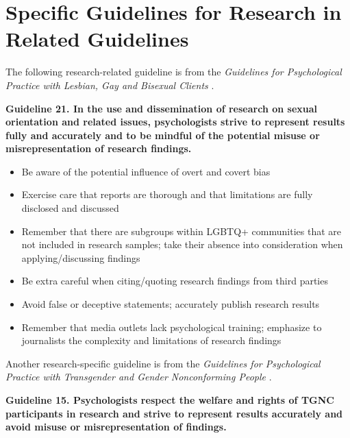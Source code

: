\documentclass[
  english,
]{book}
\providecommand{\tightlist}{%
  \setlength{\itemsep}{0pt}\setlength{\parskip}{0pt}}
\begin{document}
\hypertarget{specific-guidelines-for-research-in-related-guidelines}{%
\section{Specific Guidelines for Research in Related Guidelines}\label{specific-guidelines-for-research-in-related-guidelines}}

The following research-related guideline is from the \emph{Guidelines for Psychological Practice with Lesbian, Gay and Bisexual Clients} \citep{american_psychological_association_guidelines_2012}.

\textbf{Guideline 21. In the use and dissemination of research on sexual orientation and related issues, psychologists strive to represent results fully and accurately and to be mindful of the potential misuse or misrepresentation of research findings.}

\begin{itemize}
\tightlist
\item
  Be aware of the potential influence of overt and covert bias
\item
  Exercise care that reports are thorough and that limitations are fully disclosed and discussed
\item
  Remember that there are subgroups within LGBTQ+ communities that are not included in research samples; take their absence into consideration when applying/discussing findings
\item
  Be extra careful when citing/quoting research findings from third parties
\item
  Avoid false or deceptive statements; accurately publish research results
\item
  Remember that media outlets lack psychological training; emphasize to journalists the complexity and limitations of research findings
\end{itemize}

Another research-specific guideline is from the \emph{Guidelines for Psychological Practice with Transgender and Gender Nonconforming People} \citep{american_psychological_association_guidelines_2015}.

\textbf{Guideline 15. Psychologists respect the welfare and rights of TGNC participants in research and strive to represent results accurately and avoid misuse or misrepresentation of findings.}
\end{document}
